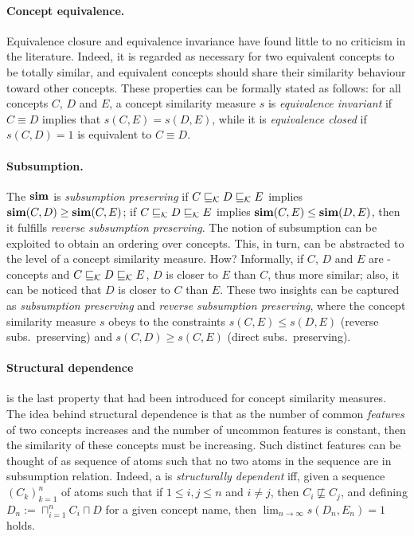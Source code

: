 \paragraph{Concept equivalence.} Equivalence closure and equivalence invariance have found little to no criticism in the literature.
Indeed, it is regarded as necessary for two equivalent concepts to be totally similar, and equivalent concepts should share their similarity behaviour toward other concepts.
These properties can be formally stated as follows: for all concepts \(C\), \(D\) and \(E\), a concept similarity measure \(s\) is \emph{equivalence invariant} if \(C \equiv D\) implies that \(s(C,E) = s(D,E)\), while it is \emph{equivalence closed} if \(s(C,D) = 1\) is equivalent to \(C \equiv D\).

  \paragraph{Subsumption.}
  The \csm \(\operatorname{\mathbf{sim}}\) is \emph{subsumption preserving} if \(C \sqsubseteq_{\mathcal{K}} D \sqsubseteq_{\mathcal{K}} E\) implies \(\operatorname{\mathbf{sim}}(C,D)  \ge \operatorname{\mathbf{sim}}(C,E)\); if \(C \sqsubseteq_{\mathcal{K}} D \sqsubseteq_{\mathcal{K}} E\) implies \(\operatorname{\mathbf{sim}}(C,E) \le \operatorname{\mathbf{sim}}(D,E)\), then it fulfills \emph{reverse subsumption preserving}.
  The notion of subsumption can be exploited to obtain an ordering over concepts.
  This, in turn, can be abstracted to the level of a concept similarity measure. How?
  Informally, if \(C\), \(D\) and \(E\) are \elh-concepts and \(C \sqsubseteq_{\mathcal{K}} D \sqsubseteq_{\mathcal{K}} E\), \(D\) is closer to \(E\) than \(C\), thus more similar;
  also, it can be noticed that \(D\) is closer to \(C\) than \(E\).
  These two insights can be captured as \emph{subsumption preserving} and \emph{reverse subsumption preserving}, where the concept similarity measure \(s\) obeys to the constraints \(s(C,E) \le s(D,E)\) (reverse subs.\ preserving) and \(s(C,D) \ge s(C,E)\) (direct subs.\ preserving).

  \paragraph{Structural dependence} is the last property that had been introduced for concept similarity measures.
  The idea behind structural dependence is that as the number of common \emph{features} of two concepts increases and the number of uncommon features is constant, then the similarity of these concepts must be increasing.
  Such distinct features can be thought of as sequence of atoms such that no two atoms in the sequence are in subsumption relation.
  Indeed, a \csm is \emph{structurally dependent} iff, given a sequence \({(C_k)}_{k=1}^n\) of atoms such that if \(1 \le i,j \le n\) and \(i \ne j\), then \(C_i \not\sqsubseteq C_j\), and defining \(D_n := \sqcap_{i=1}^n C_i \sqcap D\) for a given concept name, then \(\lim_{n \to \infty}s(D_n,E_n) = 1\) holds.
